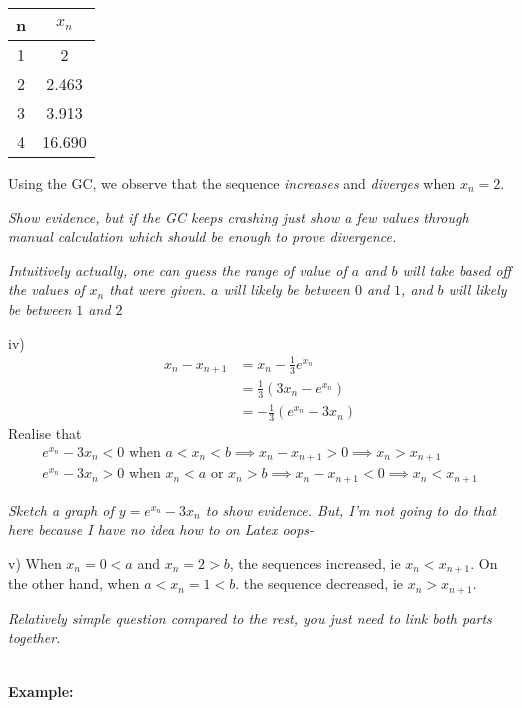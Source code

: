 \documentclass[12pt, a4paper, titlepage]{article}
\begin{document}
\begin{minipage}{0.3\textwidth}
    \begin{tabular}{c|c}
        n & $x_n$ \\
        \hline
        1 & 2 \\
        \hline
        2 & 2.463 \\
        \hline
        3 & 3.913 \\
        \hline
        4 & 16.690
    \end{tabular}
\end{minipage}
\begin{minipage}{0.6\textwidth}
    Using the GC, we observe that the sequence \emph{increases} and \emph{diverges} when $x_n = 2$.
\end{minipage}

\emph{Show evidence, but if the GC keeps crashing just show a few values through manual calculation which should be enough to prove divergence.}

\emph{Intuitively actually, one can guess the range of value of $a$ and $b$ will take based off the values of $x_n$ that were given. $a$ will likely be between $0$ and $1$, and $b$ will likely be between $1$ and $2$}

iv)
\begin{align*}
    x_n - x_{n + 1} &= x_n - \frac{1}{3}e^{x_n} \\
    &= \frac{1}{3}(3x_n - e^{x_n}) \\
    &= -\frac{1}{3}(e^{x_n} - 3x_n)
\end{align*}
Realise that
\begin{align*}
    e^{x_n} - 3x_n < 0 \text{ when } a < x_n < b \implies x_n - x_{n + 1} > 0 \implies x_n > x_{n + 1} \\
    e^{x_n} - 3x_n > 0 \text{ when } x_n < a \text{ or } x_n > b \implies x_n - x_{n + 1} < 0 \implies x_n < x_{n + 1}
\end{align*}

\emph{Sketch a graph of $y = e^{x_n} - 3x_n$ to show evidence. But, I'm not going to do that here because I have no idea how to on Latex oops-}

v)
When $x_n = 0 < a$ and $x_n = 2 > b$, the sequences increased, ie $x_n < x_{n + 1}$. On the other hand, when $a < x_n = 1 < b$. the sequence decreased, ie $x_n > x_{n + 1}$.

\emph{Relatively simple question compared to the rest, you just need to link both parts together.}

\textbf{\\ Example:}
\end{document}
